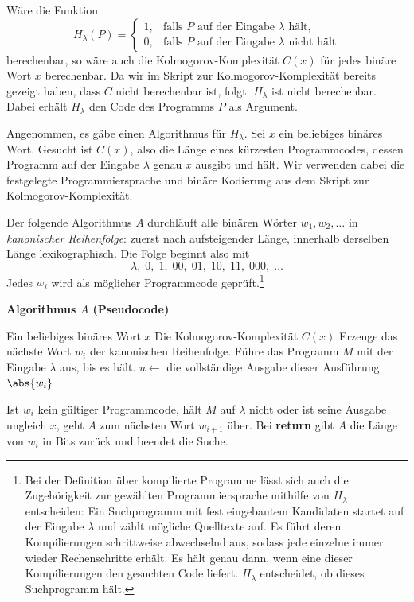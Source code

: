 \begin{mytheorem}\label{mytheorem:kolmogorov_H_lambda}
	Wäre die Funktion
	\[
		H_\lambda(P) =
		\begin{cases}
			1, & \text{falls } P \text{ auf der Eingabe } \lambda \text{ hält},\\
			0, & \text{falls } P \text{ auf der Eingabe } \lambda \text{ nicht hält}
		\end{cases}
	\]
	berechenbar, so wäre auch die Kolmogorov-Komplexität $C(x)$ für jedes binäre Wort $x$ berechenbar. Da wir im Skript zur Kolmogorov-Komplexität bereits gezeigt haben, dass $C$ nicht berechenbar ist, folgt: $H_\lambda$ ist nicht berechenbar. Dabei erhält $H_\lambda$ den Code des Programms $P$ als Argument.
	\begin{myproof}
		Angenommen, es gäbe einen Algorithmus für $H_\lambda$. Sei $x$ ein beliebiges binäres Wort. Gesucht ist $C(x)$, also die Länge eines kürzesten Programmcodes, dessen Programm auf der Eingabe $\lambda$ genau $x$ ausgibt und hält. Wir verwenden dabei die festgelegte Programmiersprache und binäre Kodierung aus dem Skript zur Kolmogorov-Komplexität.

		Der folgende Algorithmus $A$ durchläuft alle binären Wörter $w_1,w_2,\ldots$ in \emph{kanonischer Reihenfolge}: zuerst nach aufsteigender Länge, innerhalb derselben Länge lexikographisch. Die Folge beginnt also mit
		\[
			\lambda,\;0,\;1,\;00,\;01,\;10,\;11,\;000,\;\ldots
		\]
		Jedes $w_i$ wird als möglicher Programmcode geprüft.\footnote{Bei der Definition über kompilierte Programme lässt sich auch die Zugehörigkeit zur gewählten Programmiersprache mithilfe von $H_\lambda$ entscheiden: Ein Suchprogramm mit fest eingebautem Kandidaten startet auf der Eingabe $\lambda$ und zählt mögliche Quelltexte auf. Es führt deren Kompilierungen schrittweise abwechselnd aus, sodass jede einzelne immer wieder Rechenschritte erhält. Es hält genau dann, wenn eine dieser Kompilierungen den gesuchten Code liefert. $H_\lambda$ entscheidet, ob dieses Suchprogramm hält.}

		\textbf{Algorithmus $A$ (Pseudocode)}
		\begin{algorithmic}[1]
			\Require Ein beliebiges binäres Wort $x$
			\Ensure Die Kolmogorov-Komplexität $C(x)$
				\State Erzeuge das nächste Wort $w_i$ der kanonischen Reihenfolge.
						\State Führe das Programm $M$ mit der Eingabe $\lambda$ aus, bis es hält.
						\State $u \gets$ die vollständige Ausgabe dieser Ausführung
							\State \Return $\abs{w_i}$
						\EndIf
					\EndIf
				\EndIf
			\EndFor
		\end{algorithmic}
		Ist $w_i$ kein gültiger Programmcode, hält $M$ auf $\lambda$ nicht oder ist seine Ausgabe ungleich $x$, geht $A$ zum nächsten Wort $w_{i+1}$ über. Bei \textbf{return} gibt $A$ die Länge von $w_i$ in Bits zurück und beendet die Suche.


\end{myproof}
\end{mytheorem}
